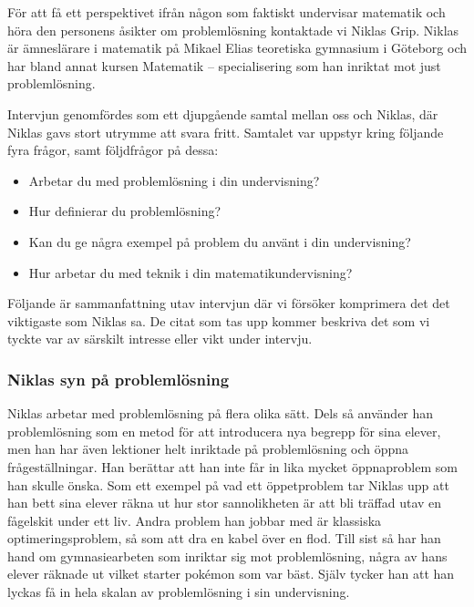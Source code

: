 \textcolor{turkos}{
För att få ett perspektivet ifrån någon som faktiskt undervisar matematik och höra den personens åsikter om problemlösning kontaktade vi Niklas Grip. Niklas är ämneslärare i matematik på Mikael Elias teoretiska gymnasium i Göteborg och har bland annat kursen Matematik – specialisering som han inriktat mot just problemlösning.
}

\textcolor{turkos}{
Intervjun genomfördes som ett djupgående samtal mellan oss och Niklas, där Niklas gavs stort utrymme att svara fritt. Samtalet var uppstyr kring följande fyra frågor, samt följdfrågor på dessa: 
}
\begin{itemize}
  \item \textcolor{turkos}{Arbetar du med problemlösning i din undervisning?}
  \item \textcolor{turkos}{Hur definierar du problemlösning?}
  \item \textcolor{turkos}{Kan du ge några exempel på problem du använt i din undervisning?}
  \item \textcolor{turkos}{Hur arbetar du med teknik i din matematikundervisning?}
\end{itemize}

\noindent \textcolor{turkos}{
Följande är sammanfattning utav intervjun där vi försöker komprimera det det viktigaste som Niklas sa. De citat som tas upp kommer beskriva det som vi tyckte var av särskilt intresse eller vikt under intervju. 
}

\subsubsection{Niklas syn på problemlösning}

\textcolor{turkos}{
Niklas arbetar med problemlösning på flera olika sätt. Dels så använder han problemlösning som en metod för att introducera nya begrepp för sina elever, men han har även lektioner helt inriktade på problemlösning och öppna frågeställningar. Han berättar att han inte får in lika mycket öppnaproblem som han skulle önska. Som ett exempel på vad ett öppetproblem tar Niklas upp att han bett sina elever räkna ut hur stor sannolikheten är att bli träffad utav en fågelskit under ett liv. Andra problem han jobbar med är klassiska optimeringsproblem, så som att dra en kabel över en flod. Till sist så har han hand om gymnasiearbeten som inriktar sig mot problemlösning, några av hans elever räknade ut vilket starter pokémon som var bäst. Själv tycker han att han lyckas få in hela skalan av problemlösning i sin undervisning. 
}

